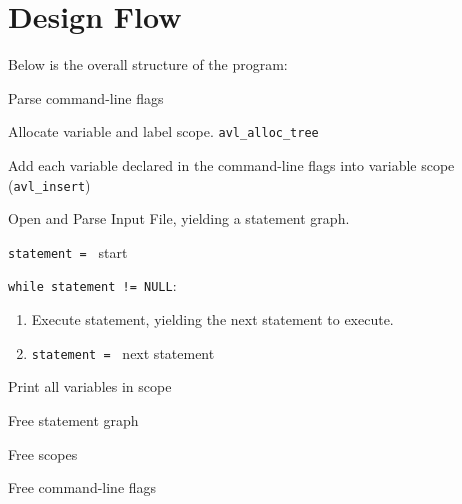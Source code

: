 \documentclass[letterpaper,11pt]{article}
\begin{document}
{	\section{Design Flow}
	{
		Below is the overall structure of the program:
		\begin{enumerate}
		{
			\item Parse command-line flags
			\item Allocate variable and label scope. \texttt{avl\_alloc\_tree}
			\item Add each variable declared in the command-line flags into
				variable scope (\texttt{avl\_insert})
			\item Open and Parse Input File, yielding a statement graph.
			\item \texttt{statement = } start
			\item \texttt{while statement != NULL}:
			\begin{enumerate}
				\item Execute statement, yielding the next statement to execute.
				\item \texttt{statement = } next statement
			\end{enumerate}
			\item Print all variables in scope
			\item Free statement graph
			\item Free scopes
			\item Free command-line flags
		}
		\end{enumerate}
	}

}
\end{document}
